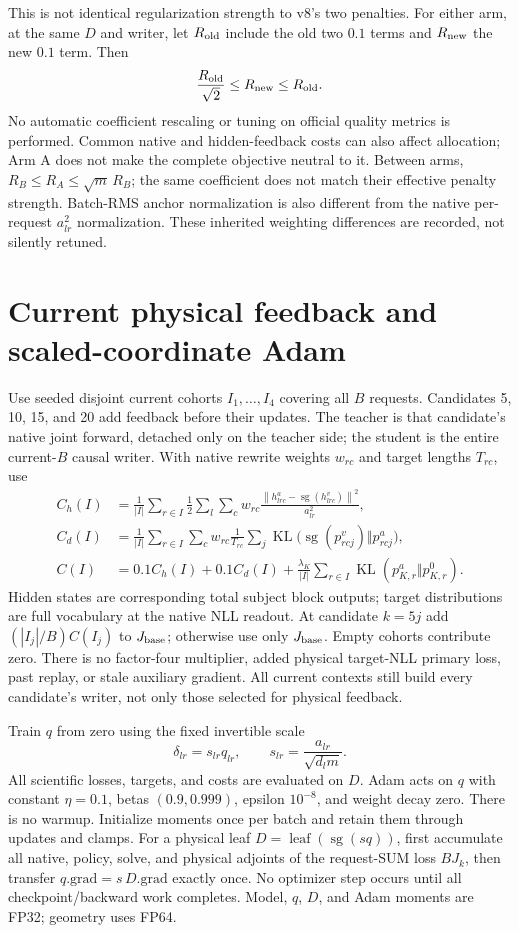 \documentclass[10pt]{article}
\newcommand{\KL}{\operatorname{KL}}
\newcommand{\sg}{\operatorname{sg}}
\newcommand{\norm}[1]{\left\lVert#1\right\rVert}
\begin{document}
This is not identical regularization strength to v8's two penalties.
For either arm, at the same $D$ and writer, let $R_{\rm old}$ include
the old two $0.1$ terms and $R_{\rm new}$ the new $0.1$ term. Then
\[
 \frac{R_{\rm old}}{\sqrt2}\leq R_{\rm new}\leq R_{\rm old}.
\]
No automatic coefficient rescaling or tuning on official quality metrics
is performed. Common native and hidden-feedback costs can also affect
allocation; Arm A does not make the complete objective neutral to it.
Between arms, $R_B\leq R_A\leq\sqrt m\,R_B$; the same coefficient does
not match their effective penalty strength. Batch-RMS anchor normalization
is also different from the native per-request $a_{lr}^2$ normalization.
These inherited weighting differences are recorded, not silently retuned.

\newpage
\section{Current physical feedback and scaled-coordinate Adam}
Use seeded disjoint current cohorts $I_1,\ldots,I_4$ covering all $B$
requests. Candidates 5, 10, 15, and 20 add feedback before their updates.
The teacher is that candidate's native joint forward, detached only on
the teacher side; the student is the entire current-$B$ causal writer.
With native rewrite weights $w_{rc}$ and target lengths $T_{rc}$, use
\begin{align}
 C_h(I)&=\frac1{|I|}\sum_{r\in I}\frac12\sum_l\sum_cw_{rc}
 \frac{\norm{h^a_{lrc}-\sg(h^v_{lrc})}^2}{a_{lr}^2},\\
 C_d(I)&=\frac1{|I|}\sum_{r\in I}\sum_cw_{rc}\frac1{T_{rc}}
 \sum_j\KL\bigl(\sg(p^v_{rcj})\Vert p^a_{rcj}\bigr),\\
 C(I)&=0.1C_h(I)+0.1C_d(I)
 +\frac{\lambda_K}{|I|}\sum_{r\in I}\KL(p^a_{K,r}\Vert p^0_{K,r}).
\end{align}
Hidden states are corresponding total subject block outputs; target
distributions are full vocabulary at the native NLL readout. At candidate
$k=5j$ add $(|I_j|/B)C(I_j)$ to $J_{\rm base}$; otherwise use only
$J_{\rm base}$. Empty cohorts contribute zero. There is no factor-four
multiplier, added physical target-NLL primary loss, past replay, or stale
auxiliary gradient. All current contexts still build every candidate's
writer, not only those selected for physical feedback.

Train $q$ from zero using the fixed invertible scale
\[
 \delta_{lr}=s_{lr}q_{lr},\qquad
 s_{lr}=\frac{a_{lr}}{\sqrt{d_lm}}.
\]
All scientific losses, targets, and costs are evaluated on $D$. Adam
acts on $q$ with constant $\eta=0.1$, betas $(0.9,0.999)$, epsilon
$10^{-8}$, and weight decay zero. There is no warmup. Initialize moments
once per batch and retain them through updates and clamps. For a physical
leaf $D=\operatorname{leaf}(\sg(sq))$, first accumulate all native,
policy, solve, and physical adjoints of the request-SUM loss $B J_k$,
then transfer $q.\mathrm{grad}=s\,D.\mathrm{grad}$ exactly once.
No optimizer step occurs until all checkpoint/backward work completes.
Model, $q$, $D$, and Adam moments are FP32; geometry uses FP64.
\end{document}
